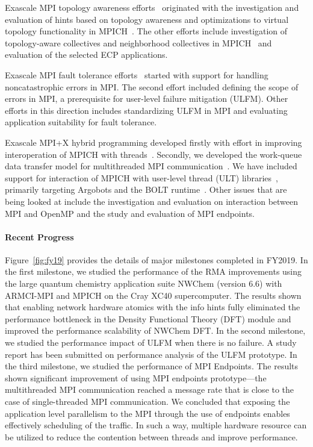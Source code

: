 Exascale MPI topology awareness efforts~\cite{Topo1,Topo2} originated
with the investigation and evaluation of hints based on topology
awareness and optimizations to virtual topology functionality in
MPICH~\cite{topo-io,topo-io2}. The other efforts include investigation
of topology-aware collectives and neighborhood collectives in
MPICH~\cite{coll} and evaluation of the selected ECP applications.

Exascale MPI fault tolerance efforts~\cite{FT1, FT2} started with
support for handling noncatastrophic errors in MPI. The second effort
included defining the scope of errors in MPI, a prerequisite for
user-level failure mitigation (ULFM). Other efforts in this direction
includes standardizing ULFM in MPI and evaluating application
suitability for fault tolerance.

Exascale MPI+X hybrid programming developed firstly with effort in
improving interoperation of MPICH with threads~\cite{interthread}.
Secondly, we developed the work-queue data transfer model for
multithreaded MPI communication~\cite{workq}. We have included support
for interaction of MPICH with user-level thread (ULT)
libraries~\cite{ULT}, primarily targeting Argobots and the BOLT
runtime~\cite{BOLT}.  Other issues that are being looked at include the
investigation and evaluation on interaction between MPI and OpenMP and
the study and evaluation of MPI endpoints.

\paragraph{Recent Progress}

Figure~\ref{fig:fy19} provides the details of major milestones completed
in FY2019. In the first milestone, we studied the performance
of the RMA improvements using the large quantum chemistry application
suite NWChem (version 6.6) with ARMCI-MPI and MPICH on the Cray XC40
supercomputer. The results shown that enabling network hardware atomics
with the info hints fully eliminated the performance bottleneck in the
Density Functional Theory (DFT) module and improved the performance
scalability of NWChem DFT. In the second milestone, we studied the
performance impact of ULFM when there is no failure. A study report has
been submitted on performance analysis of the ULFM prototype. In the
third milestone, we studied the performance of MPI Endpoints. The
results shown significant improvement of using MPI endpoints
prototype---the multithreaded MPI communication reached a message rate
that is close to the case of single-threaded MPI communication. We
concluded that exposing the application level parallelism to the MPI
through the use of endpoints enables effectively scheduling of the
traffic. In such a way, multiple hardware resource can be utilized to
reduce the contention between threads and improve performance.

